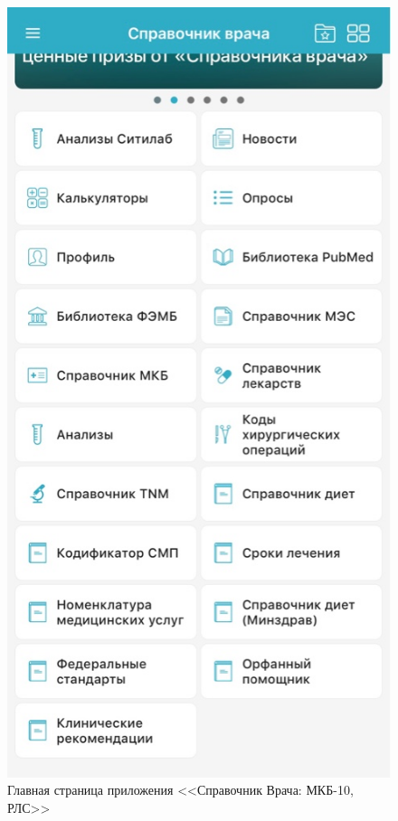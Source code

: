 \begin{enumerate}
    \begin{figure}
        \includegraphics[scale=0.6]{styles/diploma/inc/prog1.jpeg}
        \caption{Главная страница приложения <<Справочник Врача: МКБ-10, РЛС>>}
        \label{fig:fig03}
    \end{figure}


\end{enumerate}
